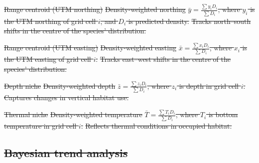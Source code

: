 \documentclass[9pt,twocolumn,twoside]{pnas-new}
\providecommand{\DIFdel}[1]{{\protect\color{red}\sout{#1}}} %
\providecommand{\DIFdelFL}[1]{\DIFdel{#1}} %
\begin{document}
{%
\DIFdelFL{Range centroid (UTM northing) }%
\DIFdelFL{Density-weighted northing }%
\DIFdelFL{$\bar{y} = \frac{\sum y_i D_i}{\sum D_i}$, where $y_i$ is the UTM northing of grid cell $i$, and $D_i$ is predicted density. }%
\DIFdelFL{Tracks north--south shifts in the centre of the species’ distribution. }%

\DIFdelFL{Range centroid (UTM easting) }%
\DIFdelFL{Density-weighted easting }%
\DIFdelFL{$\bar{x} = \frac{\sum x_i D_i}{\sum D_i}$, where $x_i$ is the UTM easting of grid cell $i$. }%
\DIFdelFL{Tracks east--west shifts in the centre of the species’ distribution. }%

\DIFdelFL{Depth niche }%
\DIFdelFL{Density-weighted depth }%
\DIFdelFL{$\bar{z} = \frac{\sum z_i D_i}{\sum D_i}$, where $z_i$ is depth in grid cell $i$. }%
\DIFdelFL{Captures changes in vertical habitat use. }%

\DIFdelFL{Thermal niche }%
\DIFdelFL{Density-weighted temperature }%
\DIFdelFL{$\bar{T} = \frac{\sum T_i D_i}{\sum D_i}$, where $T_i$ is bottom temperature in grid cell $i$. }%
\DIFdelFL{Reflects thermal conditions in occupied habitat. }%


\subsection*{\DIFdel{Bayesian trend analysis}}%

}
\end{document}
